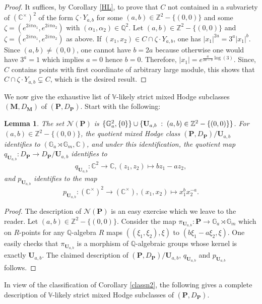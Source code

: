 \documentclass[10pt]{article}
\numberwithin{equation}{subsection}
\theoremstyle{plain}
\newtheorem{lemma}[theorem]{Lemma}
\theoremstyle{definition}
\theoremstyle{remark}
\newcommand{\Z}{\mathbb Z}
\newcommand{\Q}{\mathbb Q}
\newcommand{\C}{\mathbb C}
\newcommand{\V}{\mathbb V}
\newcommand{\mult}{\mathbb G}
\newcommand{\pp}{\mathbf P}
\newcommand{\uu}{\mathbf U}
\newcommand{\M}{\mathbf M}
\newcommand{\Np}{\mathcal{N}(\pp)}
\begin{document}
\begin{proof}
It suffices, by Corollary \ref{HL}, to prove that $C$ not contained in a subvariety of $(\C^\times)^2$ of the form $\zeta \cdot Y_{a,b}$ for some $(a,b) \in \Z^2-\{(0,0)\}$ and some $\zeta = (e^{2i\pi\alpha_1}, e^{2i\pi\alpha_2})$ with $(\alpha_1,\alpha_2) \in \Q^2$. Let $(a,b)\in \Z^2-\{(0,0)\}$ and $\zeta = (e^{2i\pi\alpha_1}, e^{2i\pi\alpha_2})$ as above. If $(x_1,x_2) \in C \cap \zeta \cdot Y_{a,b}$, one has $|x_1|^{2a} = 3^a |x_1|^b$. Since $(a,b) \neq (0,0)$, one cannot have $b = 2a$ because otherwise one would have $3^a = 1$ which implies $a = 0$ hence $b = 0$. Therefore, $|x_1| = e^{\frac{a}{2a-b}\log(3)}$. Since, $C$ contains points with first coordinate of arbitrary large module, this shows that $C \cap \zeta \cdot Y_{a,b} \subsetneq C$, which is the desired result.
\end{proof}
We now give the exhaustive list of $\V$-likely strict mixed Hodge subclasses $(\M,D_\M)$ of $(\pp, D_\pp)$. Start with the following:
\begin{lemma}\label{whodge}
The set $\Np$ is $\{\mult_a^2, \{0\}\} \cup \{\uu_{a,b} \hspace{0.1cm} : \hspace{0.1cm} (a,b) \in \Z^2-\{(0,0)\}\}$. For $(a,b) \in \Z^2 - \{(0,0)\}$, the quotient mixed Hodge class $(\pp, D_\pp)/\uu_{a,b}$ identifies to $(\mult_a \rtimes \mult_m, \C)$, and under this identification, the quotient map $q_{\uu_{a,b}} : D_\pp \rightarrow D_\pp/\uu_{a,b}$ identifies to
\[
q_{\uu_{a,b}} : \C^2 \rightarrow \C, (z_1,z_2) \mapsto bz_1 - az_2,
\]
and $p_{\uu_{a,b}}$ identifies to the map 
\[
p_{\uu_{a,b}} : (\C^\times)^2 \rightarrow (\C^\times), (x_1,x_2) \mapsto x_1^bx_2^{-a}.
\]
\end{lemma}
\begin{proof}
The description of $\Np$ is an easy exercise which we leave to the reader. Let $(a,b) \in \Z^2 - \{(0,0)\}$. Consider the map $\pi_{\uu_{a,b}} : \pp \rightarrow \mult_a \rtimes \mult_m$ which on $R$-points for any $\Q$-algebra $R$ maps $((\xi_1,\xi_2), \xi)$ to $(b\xi_1 - a\xi_2, \xi)$. One easily checks that $\pi_{\uu_{a,b}}$ is a morphism of $\Q$-algebraic groups whose kernel is exactly $\uu_{a,b}$. The claimed description of $(\pp, D_\pp)/\uu_{a,b}$, $q_{\uu_{a,b}}$ and $p_{\uu_{a,b}}$ follows.
\end{proof}
In view of the classification of Corollary \ref{classn2}, the following gives a complete description of $\V$-likely strict mixed Hodge subclasses of $(\pp, D_\pp)$.
\end{document}
